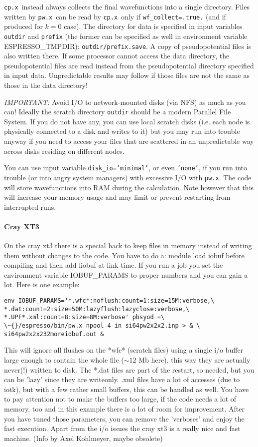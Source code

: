 \documentclass[12pt,a4paper]{article}
\def\pwx{\texttt{pw.x}}
\def\cpx{\texttt{cp.x}}
\begin{document}
\cpx\ instead always collects the final wavefunctions into a single directory.
Files written by \pwx\ can be read by \cpx\ only if \texttt{wf\_collect=.true.} (and if
produced for $k=0$ case). 
The directory for data is specified in input variables
\texttt{outdir} and \texttt{prefix} (the former can be specified
as well in environment variable ESPRESSO\_TMPDIR):
\texttt{outdir/prefix.save}. A copy of pseudopotential files
is also written there. If some processor cannot access the
data directory, the pseudopotential files are read instead
from the pseudopotential directory specified in input data.
Unpredictable results may follow if those files
are not the same as those in the data directory!

{\em IMPORTANT:}
Avoid I/O to network-mounted disks (via NFS) as much as you can! 
Ideally the scratch directory \texttt{outdir} should be a modern 
Parallel File System. If you do not have any, you can use local
scratch disks (i.e. each node is physically connected to a disk
and writes to it) but you may run into trouble anyway if you 
need to access your files that are scattered in an unpredictable
way across disks residing on different nodes.

You can use input variable \texttt{disk\_io='minimal'}, or even 
\texttt{'none'}, if you run
into trouble (or into angry system managers) with excessive I/O with \pwx. 
The code will store wavefunctions into RAM during the calculation.
Note however that this will increase your memory usage and may limit 
or prevent restarting from interrupted runs.
\paragraph{Cray XT3}
On the cray xt3 there is a special hack to keep files in
memory instead of writing them without changes to the code.
You have to do a: 
module load iobuf
before compiling and then add liobuf at link time.
If you run a job you set the environment variable 
IOBUF\_PARAMS to proper numbers and you can gain a lot.
Here is one example:
\begin{verbatim}
env IOBUF_PARAMS='*.wfc*:noflush:count=1:size=15M:verbose,\
*.dat:count=2:size=50M:lazyflush:lazyclose:verbose,\
*.UPF*.xml:count=8:size=8M:verbose' pbsyod =\
\~{}/espresso/bin/pw.x npool 4 in si64pw2x2x2.inp > & \
si64pw2x2x232moreiobuf.out &
\end{verbatim}
This will ignore all flushes on the *wfc* (scratch files) using a
single i/o buffer large enough to contain the whole file ($\sim 12$ Mb here).
this way they are actually never(!) written to disk.
The *.dat files are part of the restart, so needed, but you can be
'lazy' since they are writeonly. .xml files have a lot of accesses
(due to iotk), but with a few rather small buffers, this can be
handled as well. You have to pay attention not to make the buffers
too large, if the code needs a lot of memory, too and in this example
there is a lot of room for improvement. After you have tuned those
parameters, you can remove the 'verboses' and enjoy the fast execution.
Apart from the i/o issues the cray xt3 is a really nice and fast machine.
(Info by Axel Kohlmeyer, maybe obsolete)
\end{document}
